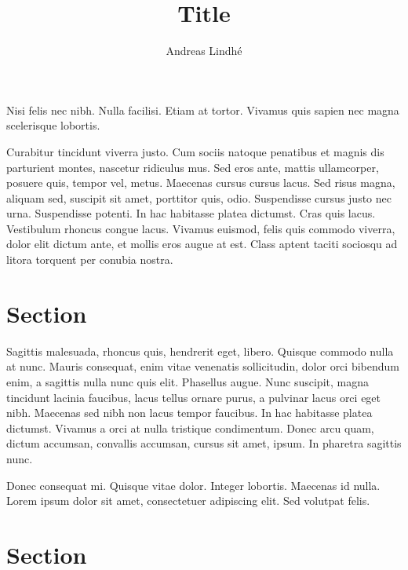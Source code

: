 \documentclass[a4paper]{article}
\title{Title}
\author{Andreas Lindhé} %
\begin{document}
\maketitle

\tableofcontents


Nisi felis nec nibh. Nulla facilisi. Etiam at tortor. Vivamus quis sapien nec
magna scelerisque lobortis.

Curabitur tincidunt viverra justo. Cum sociis natoque penatibus et magnis dis
parturient montes, nascetur ridiculus mus. Sed eros ante, mattis ullamcorper,
posuere quis, tempor vel, metus. Maecenas cursus cursus lacus. Sed risus magna,
aliquam sed, suscipit sit amet, porttitor quis, odio. Suspendisse cursus justo
nec urna. Suspendisse potenti. In hac habitasse platea dictumst. Cras quis
lacus. Vestibulum rhoncus congue lacus. Vivamus euismod, felis quis commodo
viverra, dolor elit dictum ante, et mollis eros augue at est. Class aptent
taciti sociosqu ad litora torquent per conubia nostra.


\section{Section} %
Sagittis malesuada, rhoncus quis, hendrerit eget, libero. Quisque commodo nulla
at nunc. Mauris consequat, enim vitae venenatis sollicitudin, dolor orci
bibendum enim, a sagittis nulla nunc quis elit. Phasellus augue. Nunc suscipit,
magna tincidunt lacinia faucibus, lacus tellus ornare purus, a pulvinar lacus
orci eget nibh. Maecenas sed nibh non lacus tempor faucibus. In hac habitasse
platea dictumst. Vivamus a orci at nulla tristique condimentum. Donec arcu quam,
dictum accumsan, convallis accumsan, cursus sit amet, ipsum. In pharetra
sagittis nunc.

Donec consequat mi. Quisque vitae dolor. Integer lobortis. Maecenas id nulla.
Lorem ipsum dolor sit amet, consectetuer adipiscing elit. Sed volutpat felis.


%
%

\newpage
{}

\section{Section}

%
\end{document}
